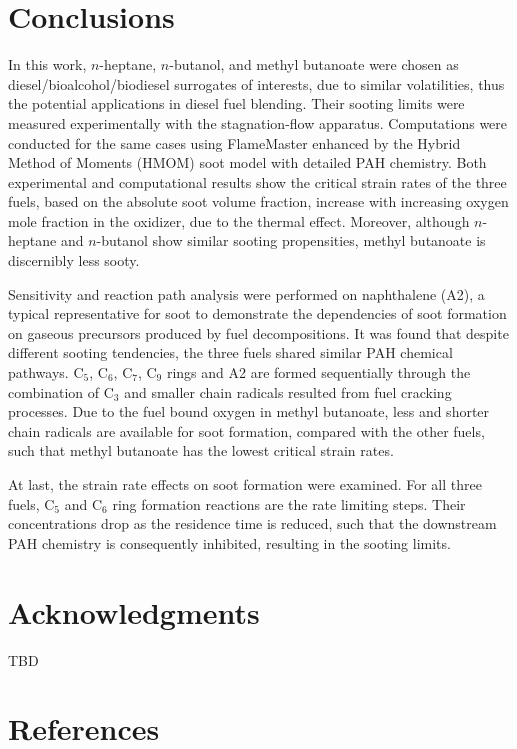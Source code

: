 \documentclass[preprint,3p,times,twocolumn]{elsarticleUS}
\begin{document}
\section{Conclusions}           

In this work, $n$-heptane, $n$-butanol, and methyl butanoate were chosen as diesel/bioalcohol/biodiesel surrogates of interests, due to similar volatilities, thus the potential applications in diesel fuel blending. Their sooting limits were measured experimentally with the stagnation-flow apparatus. Computations were conducted for the same cases using FlameMaster enhanced by the Hybrid Method of Moments (HMOM) soot model with detailed PAH chemistry. Both experimental and computational results show the critical strain rates of the three fuels, based on the absolute soot volume fraction, increase with increasing oxygen mole fraction in the oxidizer, due to the thermal effect. Moreover, although $n$-heptane and $n$-butanol show similar sooting propensities, methyl butanoate is discernibly less sooty.

Sensitivity and reaction path analysis were performed on naphthalene (A2), a typical representative for soot to demonstrate the dependencies of soot formation on gaseous precursors produced by fuel decompositions. It was found that despite different sooting tendencies, the three fuels shared similar PAH chemical pathways. C$_5$, C$_6$, C$_7$, C$_9$ rings and A2 are formed sequentially through the combination of C$_3$ and smaller chain radicals resulted from fuel cracking processes. Due to the fuel bound oxygen in methyl butanoate, less and shorter chain radicals are available for soot formation, compared with the other fuels, such that methyl butanoate has the lowest critical strain rates.

At last, the strain rate effects on soot formation were examined. For all three fuels, C$_5$ and C$_6$ ring formation reactions are the rate limiting steps. Their concentrations drop as the residence time is reduced, such that the downstream PAH chemistry is consequently inhibited, resulting in the sooting limits. 

\section*{Acknowledgments}
TBD

\section*{References}



\renewcommand{\thefigure}{\arabic{figure}}
\renewcommand{\thetable}{\arabic{table}}
\end{document}

